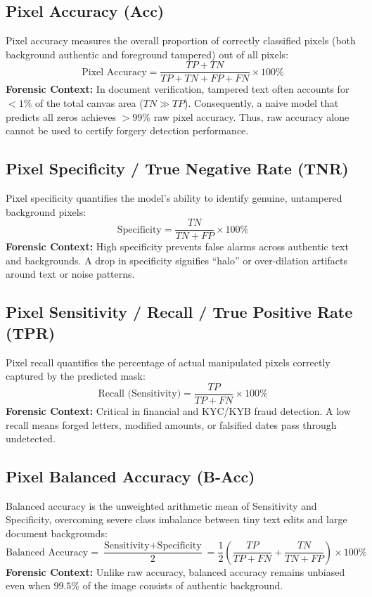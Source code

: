 \documentclass[11pt,a4paper]{article}
\begin{document}
\subsection{Pixel Accuracy (Acc)}
Pixel accuracy measures the overall proportion of correctly classified pixels (both background authentic and foreground tampered) out of all pixels:
\begin{equation}
\text{Pixel Accuracy} = \frac{TP + TN}{TP + TN + FP + FN} \times 100\%
\end{equation}
\textbf{Forensic Context:} In document verification, tampered text often accounts for $< 1\%$ of the total canvas area ($TN \gg TP$). Consequently, a naive model that predicts all zeros achieves $>99\%$ raw pixel accuracy. Thus, raw accuracy alone cannot be used to certify forgery detection performance.

\subsection{Pixel Specificity / True Negative Rate (TNR)}
Pixel specificity quantifies the model's ability to identify genuine, untampered background pixels:
\begin{equation}
\text{Specificity} = \frac{TN}{TN + FP} \times 100\%
\end{equation}
\textbf{Forensic Context:} High specificity prevents false alarms across authentic text and backgrounds. A drop in specificity signifies ``halo'' or over-dilation artifacts around text or noise patterns.

\subsection{Pixel Sensitivity / Recall / True Positive Rate (TPR)}
Pixel recall quantifies the percentage of actual manipulated pixels correctly captured by the predicted mask:
\begin{equation}
\text{Recall (Sensitivity)} = \frac{TP}{TP + FN} \times 100\%
\end{equation}
\textbf{Forensic Context:} Critical in financial and KYC/KYB fraud detection. A low recall means forged letters, modified amounts, or falsified dates pass through undetected.

\subsection{Pixel Balanced Accuracy (B-Acc)}
Balanced accuracy is the unweighted arithmetic mean of Sensitivity and Specificity, overcoming severe class imbalance between tiny text edits and large document backgrounds:
\begin{equation}
\text{Balanced Accuracy} = \frac{\text{Sensitivity} + \text{Specificity}}{2} = \frac{1}{2} \left( \frac{TP}{TP + FN} + \frac{TN}{TN + FP} \right) \times 100\%
\end{equation}
\textbf{Forensic Context:} Unlike raw accuracy, balanced accuracy remains unbiased even when $99.5\%$ of the image consists of authentic background.
\end{document}

